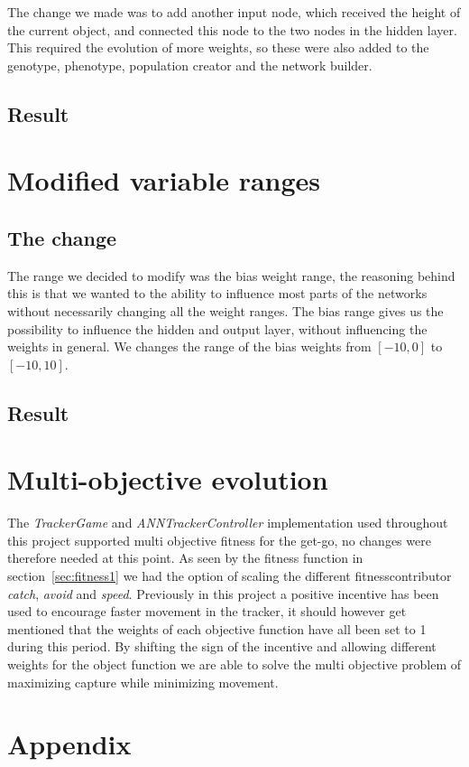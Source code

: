 \documentclass[10pt]{article}
\begin{document}
		The change we made was to add another input node, which received the height of the current object, and connected this node to the two nodes in the hidden layer. This required the evolution of more weights, so these were also added to the genotype, phenotype, population creator and the network builder.
		
	\subsection{Result}
\section{Modified variable ranges}
	\subsection{The change}
		The range we decided to modify was the bias weight range, the reasoning behind this is that we wanted to the ability to influence most parts of the networks without necessarily changing all the weight ranges. The bias range gives us the possibility to influence the hidden and output layer, without influencing the weights in general. We changes the range of the bias weights from $[-10, 0]$ to $[-10, 10]$. 
	\subsection{Result}
		
\section{Multi-objective evolution}
	The \textit{TrackerGame} and \textit{ANNTrackerController} implementation used throughout this project supported multi objective fitness for the get-go, no changes were therefore needed at this point. As seen by the fitness function in section~\ref{sec:fitness1} we had the option of scaling the different fitnesscontributor \textit{catch}, \textit{avoid} and \textit{speed}. Previously in this project a positive incentive has been used to encourage faster movement in the tracker, it should however get mentioned that the weights of each objective function have all been set to 1 during this period. By shifting the sign of the incentive and allowing different weights for the object function we are able to solve the multi objective problem of maximizing capture while minimizing movement. 
	
\section{Appendix}
	
\end{document}
